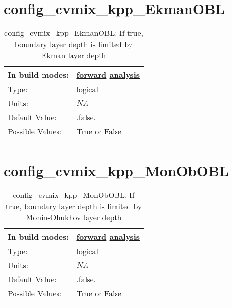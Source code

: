 \section[config\_cvmix\_kpp\_EkmanOBL]{config\_cvmix\_kpp\_EkmanOBL}
\label{sec:nm_sec_config_cvmix_kpp_EkmanOBL}
\begin{center}
\begin{longtable}{| p{2.0in} || p{4.0in} |}
    \hline
    In build modes: & \hyperref[subsec:forward_nm_tab_cvmix]{forward} \hyperref[subsec:analysis_nm_tab_cvmix]{analysis} \\
    \hline
    Type: & logical \\
    \hline
    Units: & $NA$ \\
    \hline
    Default Value: & .false. \\
    \hline
    Possible Values: & True or False \\
    \hline
    \caption{config\_cvmix\_kpp\_EkmanOBL: If true, boundary layer depth is limited by Ekman layer depth}
\end{longtable}
\end{center}
\section[config\_cvmix\_kpp\_MonObOBL]{config\_cvmix\_kpp\_MonObOBL}
\label{sec:nm_sec_config_cvmix_kpp_MonObOBL}
\begin{center}
\begin{longtable}{| p{2.0in} || p{4.0in} |}
    \hline
    In build modes: & \hyperref[subsec:forward_nm_tab_cvmix]{forward} \hyperref[subsec:analysis_nm_tab_cvmix]{analysis} \\
    \hline
    Type: & logical \\
    \hline
    Units: & $NA$ \\
    \hline
    Default Value: & .false. \\
    \hline
    Possible Values: & True or False \\
    \hline
    \caption{config\_cvmix\_kpp\_MonObOBL: If true, boundary layer depth is limited by Monin-Obukhov layer depth}
\end{longtable}
\end{center}
